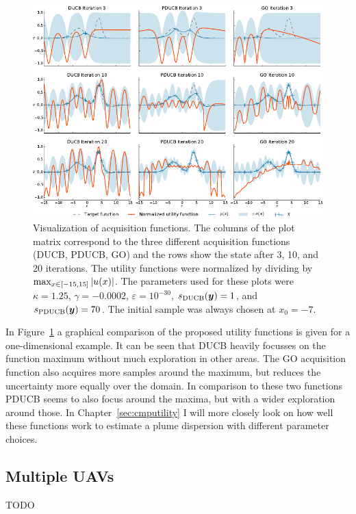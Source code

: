 \begin{figure}
    \centering
    \includegraphics{plots/acqfns}
    \caption[Visualization of acquisition functions]{Visualization of 
    acquisition functions. The columns of the plot matrix correspond to the 
    three different acquisition functions (DUCB, PDUCB, GO) and the rows show 
    the state after 3, 10, and 
        20 iterations.  The utility functions were normalized by dividing by 
           $\max_{x \in \intcc{-15, 15}} \abs[0]{u(x)}$.
        The parameters used for these plots were $\kappa = 1.25$, $\gamma 
        = -0.0002$, $\varepsilon = 10^{-30}$, $s_{\mathrm{DUCB}}(\bm{y}) = 1$, and 
        $s_{\mathrm{PDUCB}}(\bm{y}) = 70$. The initial sample was always chosen at $x_0 
        = -7$.}\label{fig:acqfns}
\end{figure}
In Figure~\ref{fig:acqfns} a graphical comparison of the proposed utility 
functions is given for a one-dimensional example. It can be seen that DUCB 
heavily focusses on the function maximum without much exploration in other 
areas. The GO acquisition function also acquires more samples around the 
maximum, but reduces the uncertainty more equally over the domain. In comparison 
to these two functions PDUCB seems to also focus around the maxima, but with 
a wider exploration around those. In Chapter~\ref{sec:cmputility} I will more 
closely look on how well these functions work to estimate a plume dispersion 
with different parameter choices.

\subsection{Multiple UAVs}
TODO

